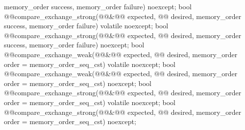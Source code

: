 \begin{itemdecl}
    memory_order success, memory_order failure) noexcept;
bool @@compare_exchange_strong(@@&@\itcorr[-1]@ expected, @@ desired,
    memory_order success, memory_order failure) volatile noexcept;
bool @@compare_exchange_strong(@@&@\itcorr[-1]@ expected, @@ desired,
    memory_order success, memory_order failure) noexcept;
bool @@compare_exchange_weak(@@&@\itcorr[-1]@ expected, @@ desired,
    memory_order order = memory_order_seq_cst) volatile noexcept;
bool @@compare_exchange_weak(@@&@\itcorr[-1]@ expected, @@ desired,
    memory_order order = memory_order_seq_cst) noexcept;
bool @@compare_exchange_strong(@@&@\itcorr[-1]@ expected, @@ desired,
    memory_order order = memory_order_seq_cst) volatile noexcept;
bool @@compare_exchange_strong(@@&@\itcorr[-1]@ expected, @@ desired,
    memory_order order = memory_order_seq_cst) noexcept;
\end{itemdecl}

